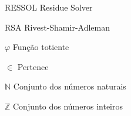 \listoffigures*
\cleardoublepage

\listofquadros*
\cleardoublepage

\listoftables*
\cleardoublepage

\begin{siglas}
  \item[RESSOL] Residue Solver
  \item[RSA] Rivest-Shamir-Adleman
\end{siglas}

\begin{simbolos}
  \item[$ \varphi $] Função totiente
  \item[$ \in $] Pertence
  \item[$ \mathbb{N} $] Conjunto dos números naturais
  \item[$ \mathbb{Z} $] Conjunto dos números inteiros
\end{simbolos}

\listofalgorithms
\cleardoublepage

\tableofcontents*
\cleardoublepage
